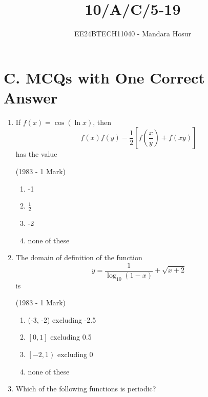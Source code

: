 \documentclass[journal,12pt,twocolumn]{IEEEtran}
\theoremstyle{remark}
\begin{document}

\vspace{3cm}

\title{10/A/C/5-19}
\author{EE24BTECH11040 - Mandara Hosur}
\maketitle
\newpage
\bigskip

\renewcommand{\thefigure}{\theenumi}
\renewcommand{\thetable}{\theenumi}

\section*{\textbf{C. MCQs with One Correct Answer}}

\begin{enumerate}

\item If $f(x) = \cos{(\ln{x})}$, then $$f(x)f(y)-\frac{1}{2} \left[f\left(\frac{x}{y}\right)+f(xy)\right]$$ has the value

\hfill{(1983 - 1 Mark)}

\begin{multicols}{2}
	\begin{enumerate}
		\item -1 
		\item $\frac{1}{2}$
		\item -2 
		\item none of these
	\end{enumerate}
\end{multicols}

\item The domain of definition of the function
$$y = \frac{1}{\log_{10}{(1-x)}} + \sqrt{x+2}$$ is

\hfill{(1983 - 1 Mark)}

\begin{multicols}{2}
	\begin{enumerate}
		\item (-3, -2) excluding -2.5 
		\item $\left[0, 1\right]$ excluding 0.5
		\item $\left[-2, 1\right)$ excluding 0 
		\item none of these
	\end{enumerate}
\end{multicols}

\item Which of the following functions is periodic?


\end{enumerate}
\end{document}
